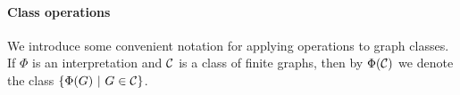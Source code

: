 %
%
%
%
%
%
%
%

\paragraph{Class operations}
We introduce some convenient notation for applying operations to graph classes.
If $\Phi$  is an interpretation and ${\cal C}$ is a class of finite graphs, then by $\Phi({\cal C})$ we denote the class $\{\Phi(G)\ |\ G\in {\cal C}\}$.

